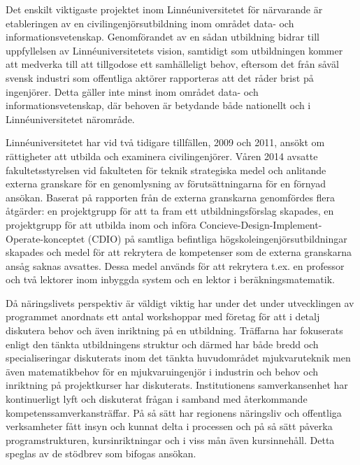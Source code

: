Det enskilt viktigaste projektet inom Linnéuniversitetet för närvarande är etableringen
av en civilingenjörsutbildning inom området data- och
informationsvetenskap. Genomförandet av en sådan utbildning bidrar till
uppfyllelsen av Linnéuniversitetets vision, samtidigt som utbildningen kommer att
medverka till att tillgodose ett samhälleligt behov, eftersom det från
såväl svensk industri som offentliga aktörer rapporteras att det råder
brist på ingenjörer. Detta gäller inte minst inom området data- och
informationsvetenskap, där behoven är betydande både nationellt och i
Linnéuniversitetet närområde.

Linnéuniversitetet har vid två tidigare tillfällen, 2009 och 2011,
ansökt om rättigheter att utbilda och examinera civilingenjörer. 
Våren 2014 avsatte fakultetsstyrelsen vid fakulteten för teknik strategiska medel och anlitande externa granskare för en genomlysning av förutsättningarna för
en förnyad ansökan. Baserat på rapporten från de externa granskarna genomfördes flera åtgärder: en projektgrupp för att ta fram ett utbildningsförslag skapades, en projektgrupp för att utbilda inom och införa Concieve-Design-Implement-Operate-konceptet (CDIO) på samtliga befintliga högskoleingenjörsutbildningar skapades och medel för att rekrytera de kompetenser som de externa granskarna ansåg saknas avsattes. Dessa medel används för att rekrytera t.ex. en professor och två lektorer inom inbyggda system och en lektor i beräkningsmatematik. 

Då näringslivets perspektiv är väldigt viktig har under det under utvecklingen
av programmet anordnats ett antal workshoppar med företag för att i detalj diskutera behov
och även inriktning på en utbildning. Träffarna har fokuserats enligt
den tänkta utbildningens struktur och därmed har både bredd och
specialiseringar diskuterats inom det tänkta huvudområdet mjukvaruteknik
men även matematikbehov för en mjukvaruingenjör i industrin och behov
och inriktning på projektkurser har diskuterats. Institutionens
samverkansenhet har kontinuerligt lyft och diskuterat frågan i samband
med återkommande kompetenssamverkansträffar. På så sätt har regionens
näringsliv och offentliga verksamheter fått insyn och kunnat delta i
processen och på så sätt påverka programstrukturen, kursinriktningar och
i viss mån även kursinnehåll. Detta speglas av de stödbrev som bifogas ansökan.